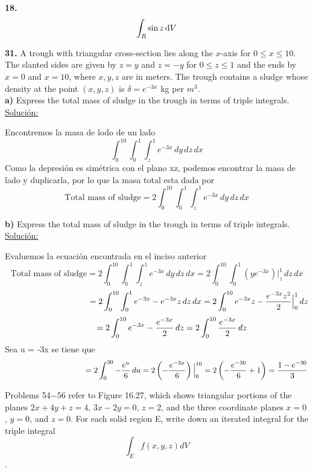\documentclass[11pt]{report}
\newcommand{\s}{\underline{Soluci\'{o}n:}}
\begin{document}
\textbf{18.} \\

\[ \int _R \sin{z} \, \text dV \]

\textbf{31.} A trough with triangular cross-section lies along the $x$-axis for
$0 \leq x \leq 10$. The slanted sides are given by $z = y$ and $z = -y$ for
$0 \leq z \leq 1$ and the ends by $x = 0$ and $x = 10$, where $x, y, z$ are in meters.
The trough contains a sludge whose density at the point $(x, y, z)$ is
$\delta = e^{-3x}$ kg per $m^3$. \\

\textbf{a)} Express the total mass of sludge in the trough in terms of triple
integrals. \\

\s

Encontremos la masa de lodo de un lado
\[\int^{10}_{0}\int^{1}_{0}\int^{1}_{z}e^{-3x} \, dy \, dz \, dx\]
Como la depresi\'{o}n es sim\'{e}trica con el plano xz, podemos encontrar la masa
de lado y duplicarla, por lo que la masa total esta dada por
\[\text{Total mass of sludge} = 2 \int^{10}_{0}\int^{1}_{0}\int^{1}_{z}e^{-3x}
 \, dy \, dz \, dx \]

\textbf{b)} Express the total mass of sludge in the trough in terms of triple
integrals. \\

\s

Evaluemos la ecuaci\'{o}n encontrada en el inciso anterior
\[\text{Total mass of sludge} =  2 \int^{10}_{0}\int^{1}_{0}\int^{1}_{z}e^{-3x}
 \, dy \, dz \, dx
 = 2 \int^{10}_{0}\int^{1}_{0}\left(y e^{-3x}\right)\Big|^{1}_{z}\, dz \, dx \]
\[\hspace{3.6cm}= 2 \int^{10}_{0}\int^{1}_{0} e^{-3x}-e^{-3x}z \, dz \, dx
  = 2 \int^{10}_{0} e^{-3x}z-\frac{e^{-3x}z^2}{2} \Big|^{1}_{0}\, dz\]
\[\hspace{1.28cm}= 2 \int^{10}_{0} e^{-3x}-\frac{e^{-3x}}{2} \, dz
  = 2 \int^{10}_{0} \frac{e^{-3x}}{2} \, dz\]
Sea u = -3x se tiene que
\[\hspace{3.57cm}= 2 \int^{30}_{0} -\frac{e^{u}}{6} \, du
  = 2 \left(-\frac{e^{-3x}}{6}\right)\Big|^{10}_{0}
  = 2 \left(-\frac{e^{-30}}{6} + 1 \right)
  = \frac{1-e^{-30}}{3}\]


Problems 54$-$56 refer to Figure 16.27, which shows triangular portions of the
planes $2x+4y+z = 4$,
$3x-2y=0$, $z = 2$,
and the three coordinate planes $x = 0$, $y = 0$, and $z = 0$.
For each solid region E, write down an iterated integral for
the triple integral $$\int_E f(x, y, z) dV$$.
\end{document}
